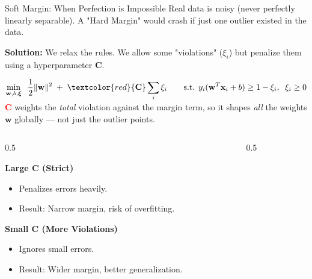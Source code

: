 \begin{frame}[allowframebreaks]{Soft Margin: When Perfection is Impossible}
    Real data is noisy (never perfectly linearly separable). A "Hard Margin" would crash if just one outlier existed in the data.
    
    \textbf{Solution:} We relax the rules. We allow some "violations" ($\xi_i$) but penalize them using a hyperparameter \textbf{C}.

    \vspace{0.3em}
    \begin{tcolorbox}[colback=black!3, colframe=black, boxsep=2pt, left=4pt, right=4pt, top=2pt, bottom=2pt]
        \centering \small
        $\displaystyle \min_{\mathbf{w}, b, \boldsymbol{\xi}}\;\; \frac{1}{2}\|\mathbf{w}\|^2 \;+\; \textcolor{red}{\mathbf{C}} \sum_i \xi_i \qquad \text{s.t. } y_i(\mathbf{w}^T\mathbf{x}_i + b) \geq 1 - \xi_i,\;\; \xi_i \geq 0$
        \\[0.2em]
        {\scriptsize \textcolor{red}{$\mathbf{C}$} weights the \emph{total} violation against the margin term, so it shapes \emph{all} the weights $\mathbf{w}$ globally --- not just the outlier points.}
    \end{tcolorbox}
    \framebreak
    \begin{columns}[c]
        \begin{column}{0.5\textwidth}
            \begin{tcolorbox}[colback=red!5, title=\textbf{The Hyperparameter C}]
                \textbf{Large C (Strict)}
                \begin{itemize}
                    \item Penalizes errors heavily.
                    \item Result: Narrow margin, risk of overfitting.
                \end{itemize}
                
                \vspace{0.5em}
                \textbf{Small C (More Violations)}
                \begin{itemize}
                    \item Ignores small errors.
                    \item Result: Wider margin, better generalization.
                \end{itemize}
            \end{tcolorbox}
        \end{column}
        \begin{column}{0.5\textwidth}
            \centering
\end{column}
\end{columns}
\end{frame}
